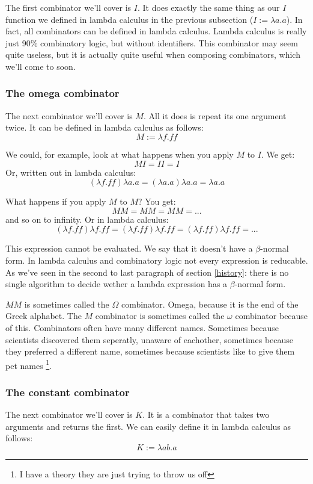 \documentclass[11pt]{article}
\begin{document}
The first combinator we'll cover is \(I\). It does exactly the same thing as
our \(I\) function we defined in lambda calculus in the previous subsection
(\(I:=\lambda a.a\)). In fact, all combinators can be defined in lambda
calculus. Lambda calculus is really just 90\% combinatory logic, but without
identifiers. This combinator may seem quite useless, but it is actually quite
useful when composing combinators, which we'll come to soon.

\subsubsection{The omega combinator}

The next combinator we'll cover is \(M\). All it does is repeat its one
argument twice. It can be defined in lambda calculus as follows:
\[M:=\lambda f.ff\]

We could, for example, look at what happens when you apply \(M\) to \(I\). We
get:
\[M I = I I = I\]
Or, written out in lambda calculus:
\[(\lambda f.ff)\lambda a.a=(\lambda a.a)\lambda a.a=\lambda a.a\]

What happens if you apply \(M\) to \(M\)? You get:
\[M M = M M = M M = ...\]
and so on to infinity. Or in lambda calculus:
\[(\lambda f.ff)\lambda f.ff=(\lambda f.ff)\lambda f.ff=(\lambda f.ff)\lambda f.ff=...\]

This expression cannot be evaluated. We say that it doesn't have a
\(\beta\)-normal form. In lambda calculus and combinatory logic not every
expression is reducable. As we've seen in the second to last paragraph of
section \ref{history}: there is no single algorithm to decide wether a lambda
expression has a \(\beta\)-normal form.

\(M M\) is sometimes called the \(\Omega\) combinator. Omega, because it is the
end of the Greek alphabet. The \(M\) combinator is sometimes called the
\(\omega\) combinator because of this. Combinators often have many different
names. Sometimes because scientists discovered them seperatly, unaware of
eachother, sometimes because they preferred a different name, sometimes because
scientists like to give them pet names \footnote{I have a theory they are just
trying to throw us off}.

\subsubsection{The constant combinator}

The next combinator we'll cover is \(K\). It is a combinator that takes two
arguments and returns the first. We can easily define it in lambda calculus as
follows:
\[K:=\lambda ab.a\]
\end{document}
